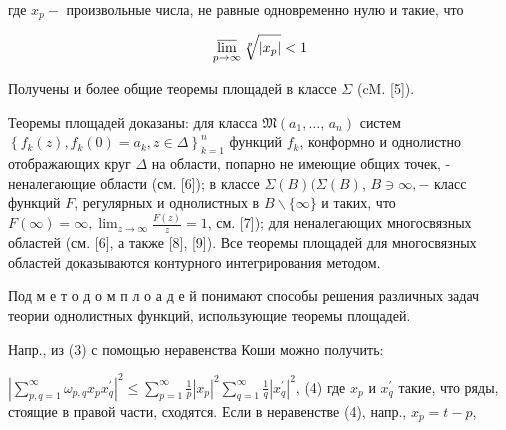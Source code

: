 \documentclass[10pt]{article}
\begin{document}
где $x_{p}-$ произвольные числа, не равные одновременно нулю и такие, что



\[

\varlimsup_{p \rightarrow \infty} \sqrt[p]{\left|x_{p}\right|}<1

\]



Получены и более общие теоремы площадей в классе $\Sigma$ (cM. [5]).



Теоремы площадей доказаны: для класса $\mathfrak{M}\left(a_{1}, \ldots\right.$, $\left.a_{n}\right)$ систем $\left\{f_{k}(z), f_{k}(0)=a_{k}, z \in \Delta\right\}_{k=1}^{n}$ функций $f_{k}$, конформно и однолистно отображающих круг $\Delta$ на области, попарно не имеющие общих точек, - неналегающие области (см. [6]); в классе $\Sigma(B)(\Sigma(B)$, $B \ni \infty,-$ класс функций $F$, регулярных и однолистных в $B \backslash\{\infty\}$ и таких, что $F(\infty)=\infty, \lim _{z \rightarrow \infty} \frac{F(z)}{z}=1$, см. [7]); для неналегающих многосвязных областей (см. [6], а также [8], [9]). Все теоремы площадей для многосвязных областей доказываются контурного интегрирования методом.



Под м е т о д о м п л о а д е й понимают способы решения различных задач теории однолистных функций, использующие теоремы площадей.



Напр., из (3) с помощью неравенства Коши можно получить:



$\left|\sum_{p, q=1}^{\infty} \omega_{p, q} x_{p} x_{q}^{\prime}\right|^{2} \leqslant \sum_{p=1}^{\infty} \frac{1}{p}\left|x_{p}\right|^{2} \sum_{q=1}^{\infty} \frac{1}{q}\left|x_{q}^{\prime}\right|^{2}$, (4) где $x_{p}$ и $x_{q}^{\prime}$ такие, что ряды, стоящие в правой части, сходятся. Если в неравенстве (4), напр., $x_{p}=t-p$,
\end{document}

